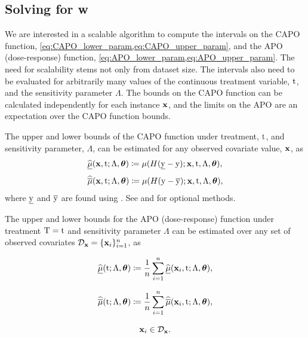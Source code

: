 \subsection{Solving for w}
\label{sec:algorithm}
We are interested in a scalable algorithm to compute the intervals on the CAPO function, \cref{eq:CAPO_lower_param,eq:CAPO_upper_param}, and the APO (dose-response) function, \cref{eq:APO_lower_param,eq:APO_upper_param}.
The need for scalability stems not only from dataset size.
The intervals also need to be evaluated for arbitrarily many values of the continuous treatment variable, $\mathrm{t}$, and the sensitivity parameter $\Lambda$.
The bounds on the CAPO function can be calculated independently for each instance $\mathbf{x}$, 
and the limits on the APO are an expectation over the CAPO function bounds.

The upper and lower bounds of the CAPO function under treatment, $\mathrm{t}$, and sensitivity parameter, $\Lambda$, can be estimated for any observed covariate value, $\mathbf{x}$, as
\begin{equation*}
    \widehat{\underline{\mu}}(\mathbf{x}, \mathrm{t}; \Lambda, \bm{\theta}) \coloneqq \mu(H(\underline{\mathrm{y}} - \mathrm{y}); \mathbf{x}, \mathrm{t}, \Lambda, \bm{\theta}),
\end{equation*}
\begin{equation*}
    \widehat{\overline{\mu}}(\mathbf{x}, \mathrm{t}; \Lambda, \bm{\theta}) \coloneqq \mu(H(\mathrm{y} - \overline{\mathrm{y}}); \mathbf{x}, \mathrm{t}, \Lambda, \bm{\theta}),
\end{equation*}
where $\underline{\mathrm{y}}$ and $\overline{\mathrm{y}}$ are found using .
See  and  for optional methods.

The upper and lower bounds for the APO (dose-response) function under treatment $\mathrm{T}=\mathrm{t}$ and sensitivity parameter $\Lambda$ can be estimated over any set of observed covariates $\mathcal{D}_{\mathbf{x}} = \{\mathbf{x}_i\}_{i=1}^n$, as
\noindent
\begin{minipage}{.45\linewidth}
    \begin{equation*}
        \widehat{\underline{\mu}}(\mathrm{t}; \Lambda, \bm{\theta}) \coloneqq \frac{1}{n} \sum_{i = 1}^{n} \widehat{\underline{\mu}}(\mathbf{x}_i, \mathrm{t}; \Lambda, \bm{\theta}),
    \end{equation*}
\end{minipage}%
\begin{minipage}{.45\linewidth}
    \begin{equation*}
        \widehat{\overline{\mu}}(\mathrm{t}; \Lambda, \bm{\theta}) \coloneqq \frac{1}{n} \sum_{i = 1}^{n} \widehat{\overline{\mu}}(\mathbf{x}_i, \mathrm{t}; \Lambda, \bm{\theta}),
    \end{equation*}
\end{minipage}%
\begin{minipage}{.1\linewidth}
    \begin{equation*}
        \mathbf{x}_i \in \mathcal{D}_{\mathbf{x}}.
    \end{equation*}
\end{minipage}
